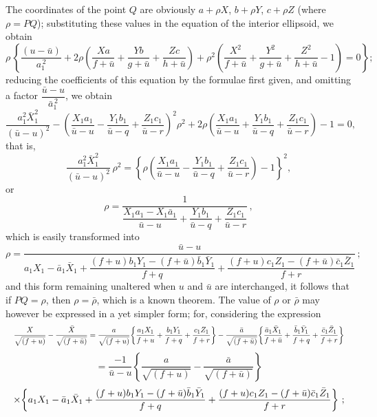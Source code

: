 \documentclass[11pt]{article}
\begin{document}
The coordinates of the point $Q$ are obviously $a + \rho X$, $b + \rho Y$, $c + \rho Z$ (where $\rho = PQ$); substituting these values in the equation of the interior ellipsoid, we obtain
\[
\rho\,\!\left\{\frac{(u - \bar{u})}{a_{1}^{\,2}} + 2\rho\!\left(\frac{Xa}{f + \bar{u}} + \frac{Yb}{g + \bar{u}} + \frac{Zc}{h + \bar{u}}\right) + \rho^{2}\!\left(\frac{X^{2}}{f + \bar{u}} + \frac{Y^{2}}{g + \bar{u}} + \frac{Z^{2}}{h + \bar{u}} - 1\right) = 0\right\};
\]
reducing the coefficients of this equation by the formulae first given, and omitting a factor $\dfrac{\bar{u} - u}{\bar{a}_{1}^{\,2}}$, we obtain
\[
\frac{a_{1}^{2} \bar{X}_{1}^{2}}{(\bar{u} - u)^{2}} - \!\left(\frac{X_{1} a_{1}}{\bar{u} - u} - \frac{Y_{1} b_{1}}{\bar{u} - q} + \frac{Z_{1} c_{1}}{\bar{u} - r}\right)^{\!2} \rho^{2} + 2 \rho\!\left(\frac{X_{1} a_{1}}{\bar{u} - u} + \frac{Y_{1} b_{1}}{\bar{u} - q} + \frac{Z_{1} c_{1}}{\bar{u} - r}\right) - 1 = 0,
\]
that is,
\[
\frac{a_{1}^{2} \bar{X}_{1}^{2}}{(\bar{u} - u)^{2}}\,\rho^{2} = \!\left\{\rho\!\left(\frac{X_{1} a_{1}}{\bar{u} - u} - \frac{Y_{1} b_{1}}{\bar{u} - q} + \frac{Z_{1} c_{1}}{\bar{u} - r}\right) - 1\right\}^{\!2},
\]
or
\[
\rho = \frac{1}{\dfrac{X_{1} a_{1} - X_{1}\bar{a}_{1}}{\bar{u} - u} + \dfrac{Y_{1} b_{1}}{\bar{u} - q} + \dfrac{Z_{1} c_{1}}{\bar{u} - r}}\,,
\]
which is easily transformed into
\[
\rho = \frac{\bar{u} - u}{a_{1} X_{1} - \bar{a}_{1} \bar{X}_{1} + \dfrac{(f + u) b_{1} Y_{1} - (f + \bar{u}) \bar{b}_{1} \bar{Y}_{1}}{f + q} + \dfrac{(f + u) c_{1} Z_{1} - (f + \bar{u}) \bar{c}_{1} \bar{Z}_{1}}{f + r}}\,;
\]
and this form remaining unaltered when $u$ and $\bar{u}$ are interchanged, it follows that if $PQ = \rho$, then $\rho = \bar{\rho}$, which is a known theorem. The value of $\rho$ or $\bar{\rho}$ may however be expressed in a yet simpler form; for, considering the expression
\[ \resizebox{\textwidth}{!}{$\displaystyle
\frac{X}{\sqrt{(f + u)}} - \frac{\bar{X}}{\sqrt{(f + \bar{u})}}
= \frac{a}{\sqrt{(f + u)}}\!\left\{\frac{a_{1} X_{1}}{f + u} + \frac{b_{1} Y_{1}}{f + q} + \frac{c_{1} Z_{1}}{f + r}\right\}
- \frac{\bar{a}}{\sqrt{(f + \bar{u})}}\!\left\{\frac{\bar{a}_{1} \bar{X}_{1}}{f + \bar{u}} + \frac{\bar{b}_{1} \bar{Y}_{1}}{f + q} + \frac{\bar{c}_{1} \bar{Z}_{1}}{f + r}\right\}
$} \]
\[
= \frac{-1}{\bar{u} - u}\!\left\{\frac{a}{\sqrt{(f + u)}} - \frac{\bar{a}}{\sqrt{(f + \bar{u})}}\right\}
\]
\[ \resizebox{\textwidth}{!}{$\displaystyle
\times \!\left\{a_{1} X_{1} - \bar{a}_{1} \bar{X}_{1} + \frac{(f + u) b_{1} Y_{1} - (f + \bar{u}) \bar{b}_{1} \bar{Y}_{1}}{f + q} + \frac{(f + u) c_{1} Z_{1} - (f + \bar{u}) \bar{c}_{1} \bar{Z}_{1}}{f + r}\right\}\,;
$} \]
\end{document}
